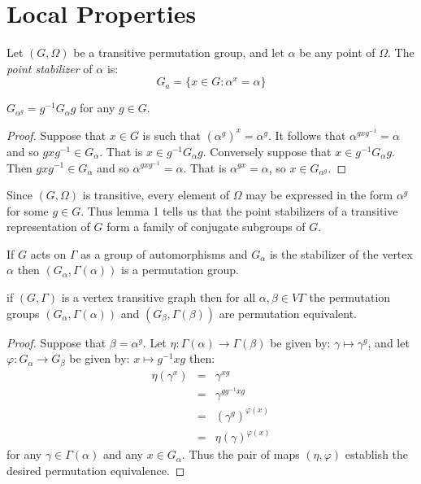 \section{Local Properties}

\begin{definition}[Stabilizer]
Let $(G, \Omega)$ be a transitive permutation group,
and let $\alpha$ be any point of $\Omega$.
The \emph{point stabilizer} of $\alpha$ is:
$$ G_a = \{ x \in G : \alpha^x = \alpha  \} $$
\end{definition}

\begin{lemma}
$G_{\alpha^g} = g^{-1} G_{\alpha} g$
for any $g \in G$. 
\begin{proof}
Suppose that $x \in G$ is such that $(\alpha^g)^x = \alpha^g$.
It follows that $\alpha^{gxg^{-1}} = \alpha$
and so $gxg^{-1} \in G_\alpha$. That is $x \in g^{-1}G_\alpha g$.
Conversely suppose that $x \in g^{-1}G_\alpha g$.
Then $gxg^{-1} \in G_\alpha$ and so $\alpha^{gxg^{-1}} = \alpha$.
That is $\alpha^{gx} = \alpha$, so $x \in G_{\alpha^g}$.
\end{proof}
\end{lemma}

Since $(G,\Omega)$ is transitive, every element of $\Omega$
may be expressed in the form $\alpha^g$ for some $g \in G$.
Thus lemma 1 tells us that the point stabilizers of a transitive
representation of $G$ form a family of conjugate subgroups of $G$.

If $G$ acts on $\Gamma$ as a group of automorphisms
and $G_\alpha$ is the stabilizer of the vertex $\alpha$
then $(G_\alpha, \Gamma(\alpha))$ is a permutation group.

\begin{proposition}
if $(G, \Gamma)$ is a vertex transitive graph
then for all $\alpha, \beta \in V \Gamma$
the permutation groups $(G_\alpha, \Gamma(\alpha))$ and
$(G_\beta, \Gamma(\beta))$ are permutation equivalent.

\begin{proof}
Suppose that $\beta = \alpha^g$. 
Let $\eta : \Gamma(\alpha) \to \Gamma(\beta) $ be given by: $ \gamma \mapsto \gamma^g $,
and let $\varphi : G_\alpha \to G_\beta $
be given by: $ x \mapsto g^{-1} x g $
then:
\begin{eqnarray*}
\eta(\gamma^x) & = & \gamma^{xg} \\
               & = & \gamma^{gg^{-1}xg} \\
	       & = & (\gamma^g)^{\varphi(x)} \\
               & = & \eta(\gamma)^{\varphi(x)}
\end{eqnarray*}	       
for any $\gamma \in \Gamma(\alpha)$ and any $x \in G_\alpha$.
Thus the pair of maps $(\eta,\varphi)$ establish the desired
permutation equivalence.
\end{proof}
\end{proposition}

